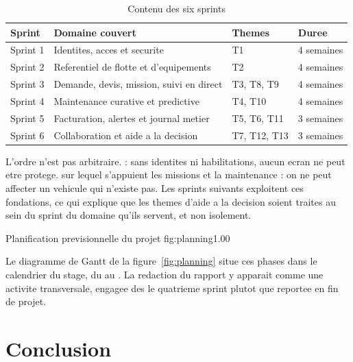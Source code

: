 \begin{table}[H]
\centering
\caption{Contenu des six sprints}
\label{tab:sprints}
\small
\begin{tabularx}{\textwidth}{@{}p{1.5cm}Xp{2.6cm}p{2.3cm}@{}}
\toprule
\textbf{Sprint} & \textbf{Domaine couvert} & \textbf{Themes} & \textbf{Duree} \\
\midrule
Sprint 1 & Identites, acces et securite & T1 & 4 semaines \\
Sprint 2 & Referentiel de flotte et d'equipements & T2 & 4 semaines \\
Sprint 3 & Demande, devis, mission, suivi en direct & T3, T8, T9 & 4 semaines \\
Sprint 4 & Maintenance curative et predictive & T4, T10 & 4 semaines \\
Sprint 5 & Facturation, alertes et journal metier & T5, T6, T11 & 3 semaines \\
Sprint 6 & Collaboration et aide a la decision & T7, T12, T13 & 3 semaines \\
\bottomrule
\end{tabularx}
\end{table}

L'ordre n'est pas arbitraire.  : sans identites ni habilitations, aucun ecran ne peut etre
protege.  sur lequel
s'appuient les missions et la maintenance : on ne peut affecter un
vehicule qui n'existe pas. Les sprints suivants exploitent ces
fondations, ce qui explique que les themes d'aide a la decision soient
traites au sein du sprint du domaine qu'ils servent, et non isolement.

  {Planification previsionnelle du projet}
  {fig:planning}{1.00}

Le diagramme de Gantt de la figure~\ref{fig:planning} situe ces phases
dans le calendrier du stage, du \stageDebut{} au \stageFin. La redaction
du rapport y apparait comme une activite transversale, engagee des le
quatrieme sprint plutot que reportee en fin de projet.

\section*{Conclusion}

